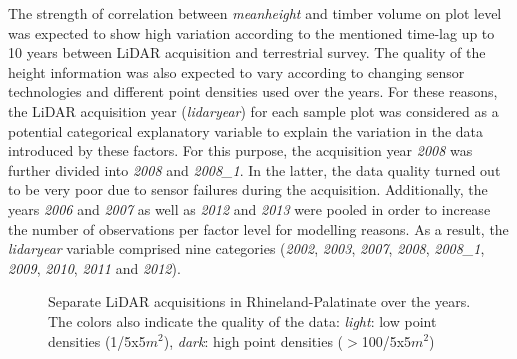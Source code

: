 The strength of correlation between \textit{meanheight} and timber volume on plot level was expected to show high variation according to the mentioned time-lag up to 10 years between LiDAR acquisition and terrestrial survey. The quality of the height information was also expected to vary according to changing sensor technologies and different point densities used over the years. For these reasons, the LiDAR acquisition year (\textit{lidaryear}) for each sample plot was considered as a potential categorical explanatory variable to explain the variation in the data introduced by these factors. For this purpose, the acquisition year \textit{2008} was further divided into \textit{2008} and \textit{2008\_1}. In the latter, the data quality turned out to be very poor due to sensor failures during the acquisition. Additionally, the years \textit{2006} and \textit{2007} as well as \textit{2012} and \textit{2013} were pooled in order to increase the number of observations per factor level for modelling reasons. As a result, the \textit{lidaryear} variable comprised nine categories (\textit{2002}, \textit{2003}, \textit{2007}, \textit{2008}, \textit{2008\_1}, \textit{2009}, \textit{2010}, \textit{2011} and \textit{2012}).

\begin{figure}[H]
\centering
{}
\caption{Separate LiDAR acquisitions in Rhineland-Palatinate over the years. The colors also indicate the quality of the data: \textit{light}: low point densities (1/5x5$m^2$), \textit{dark}: high point densities ($>$100/5x5$m^2$)}
\label{abb:lidaryears}
\end{figure}


